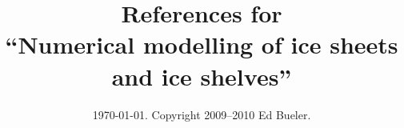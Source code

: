 \documentclass[11pt,final]{amsart}
\begin{document}
\title[References for ``Numerical modelling'']{References for \\ ``Numerical modelling of ice sheets and ice shelves''}

\date{\today.  Copyright 2009--2010  Ed Bueler.}

\maketitle

\small
\vspace{-0.3in}



\end{document}
